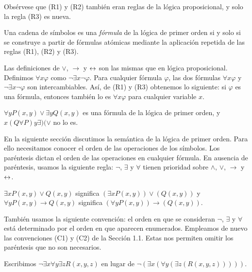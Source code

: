 \documentclass[12pt,a4paper]{book}
\begin{document}
    Obsérvese que (R1) y (R2) también eran reglas de la lógica proposicional, y solo la regla (R3) es nueva.

    \begin{definicion}\label{def:formula-fol}
        Una cadena de símbolos es una \textit{fórmula} de la lógica de primer orden si y solo si se construye a partir de
        fórmulas atómicas mediante la aplicación repetida de las reglas (R1), (R2) y (R3).
    \end{definicion}

    Las definiciones de $\vee$, $\rightarrow$ y $\leftrightarrow$ son las mismas que en lógica proposicional. Definimos $\forall x\varphi$
    como $\neg\exists x\neg\varphi$. Para cualquier fórmula $\varphi$, las dos fórmulas $\forall x\varphi$ y $\neg\exists x\neg\varphi$
    son intercambiables. Así, de (R1) y (R3) obtenemos lo siguiente: si $\varphi$ es una fórmula, entonces también lo es
    $\forall x\varphi$ para cualquier variable $x$.

    \begin{ejemplo}
        $\forall yP(x,y)\vee\exists yQ(x,y)$ es una fórmula de la lógica de primer orden, y $x(Q\forall P)y\exists)(\vee$ no
        lo es.
    \end{ejemplo}

    En la siguiente sección discutimos la semántica de la lógica de primer orden. Para ello necesitamos conocer el orden de
    las operaciones de los símbolos. Los paréntesis dictan el orden de las operaciones en cualquier fórmula. En ausencia de
    paréntesis, usamos la siguiente regla: $\neg$, $\exists$ y $\forall$ tienen prioridad sobre $\wedge$, $\vee$,
    $\rightarrow$ y $\leftrightarrow$.

    \begin{ejemplo}
        $\exists xP(x,y)\vee Q(x,y)$ significa $(\exists xP(x,y))\vee(Q(x,y))$ y $\forall yP(x,y)\rightarrow Q(x,y)$
        significa $(\forall yP(x,y))\rightarrow(Q(x,y))$.
    \end{ejemplo}

    También usamos la siguiente convención: el orden en que se consideran $\neg$, $\exists$ y $\forall$ está determinado por
    el orden en que aparecen enumerados. Empleamos de nuevo las convenciones (C1) y (C2) de la Sección 1.1. Estas nos
    permiten omitir los paréntesis que no son necesarios.

    \begin{ejemplo}
        Escribimos $\neg\exists x\forall y\exists zR(x,y,z)$ en lugar de $\neg(\exists x(\forall y(\exists z(R(x,y,z)))))$.
    \end{ejemplo}
\end{document}
